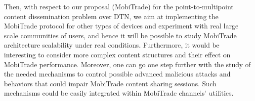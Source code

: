 Then, with respect to our proposal (MobiTrade) for the point-to-multipoint content dissemination problem over DTN, we aim at implementing the MobiTrade protocol for other types of devices and experiment with real large scale communities of users, and hence it will be possible to study MobiTrade architecture scalability under real conditions. Furthermore, it would be interesting to consider more complex content structures and their effect on MobiTrade performance. Moreover, one can go one step further with the study of the needed mechanisms to control possible advanced malicious attacks and behaviors that could impair MobiTrade content sharing sessions. Such mechanisms could be easily integrated within MobiTrade channels' utilities.
    


